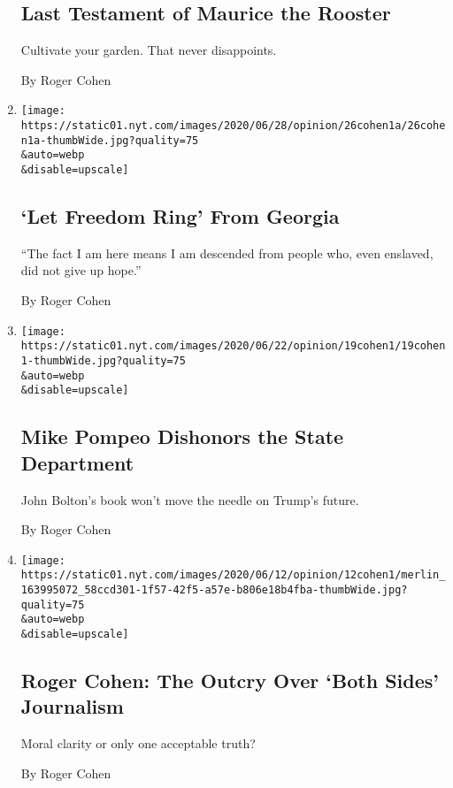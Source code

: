 \begin{enumerate}
  \hypertarget{last-testament-of-maurice-the-rooster}{%
  \subsection{Last Testament of Maurice the
  Rooster}\label{last-testament-of-maurice-the-rooster}}

  Cultivate your garden. That never disappoints.

  By Roger Cohen
\item
  \href{/2020/06/26/opinion/let-freedom-ring-from-georgia.html}{}

  \texttt{[image: https://static01.nyt.com/images/2020/06/28/opinion/26cohen1a/26cohen1a-thumbWide.jpg?quality=75\\\&auto=webp\\\&disable=upscale]}

  \hypertarget{let-freedom-ring-from-georgia}{%
  \subsection{`Let Freedom Ring' From
  Georgia}\label{let-freedom-ring-from-georgia}}

  ``The fact I am here means I am descended from people who, even
  enslaved, did not give up hope.''

  By Roger Cohen
\item
  \href{/2020/06/19/opinion/mike-pompeo-state-department.html}{}

  \texttt{[image: https://static01.nyt.com/images/2020/06/22/opinion/19cohen1/19cohen1-thumbWide.jpg?quality=75\\\&auto=webp\\\&disable=upscale]}

  \hypertarget{mike-pompeo-dishonors-the-state-department}{%
  \subsection{Mike Pompeo Dishonors the State
  Department}\label{mike-pompeo-dishonors-the-state-department}}

  John Bolton's book won't move the needle on Trump's future.

  By Roger Cohen
\item
  \href{/2020/06/12/opinion/journalism-debate.html}{}

  \texttt{[image: https://static01.nyt.com/images/2020/06/12/opinion/12cohen1/merlin\_163995072\_58ccd301-1f57-42f5-a57e-b806e18b4fba-thumbWide.jpg?quality=75\\\&auto=webp\\\&disable=upscale]}

  \hypertarget{roger-cohen-the-outcry-over-both-sides-journalism}{%
  \subsection{Roger Cohen: The Outcry Over `Both Sides'
  Journalism}\label{roger-cohen-the-outcry-over-both-sides-journalism}}

  Moral clarity or only one acceptable truth?

  By Roger Cohen
\end{enumerate}

